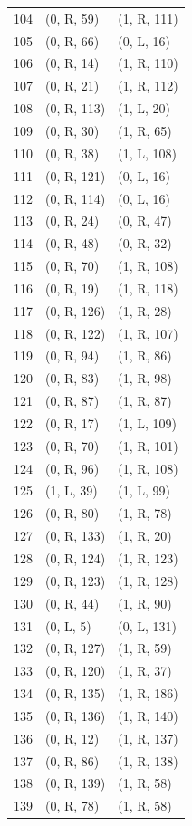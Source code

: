 \begin{longtable}{rll}
104 & (0, R, 59) & (1, R, 111) \\
105 & (0, R, 66) & (0, L, 16) \\
106 & (0, R, 14) & (1, R, 110) \\
107 & (0, R, 21) & (1, R, 112) \\
108 & (0, R, 113) & (1, L, 20) \\
109 & (0, R, 30) & (1, R, 65) \\
110 & (0, R, 38) & (1, L, 108) \\
111 & (0, R, 121) & (0, L, 16) \\
112 & (0, R, 114) & (0, L, 16) \\
113 & (0, R, 24) & (0, R, 47) \\
114 & (0, R, 48) & (0, R, 32) \\
115 & (0, R, 70) & (1, R, 108) \\
116 & (0, R, 19) & (1, R, 118) \\
117 & (0, R, 126) & (1, R, 28) \\
118 & (0, R, 122) & (1, R, 107) \\
119 & (0, R, 94) & (1, R, 86) \\
120 & (0, R, 83) & (1, R, 98) \\
121 & (0, R, 87) & (1, R, 87) \\
122 & (0, R, 17) & (1, L, 109) \\
123 & (0, R, 70) & (1, R, 101) \\
124 & (0, R, 96) & (1, R, 108) \\
125 & (1, L, 39) & (1, L, 99) \\
126 & (0, R, 80) & (1, R, 78) \\
127 & (0, R, 133) & (1, R, 20) \\
128 & (0, R, 124) & (1, R, 123) \\
129 & (0, R, 123) & (1, R, 128) \\
130 & (0, R, 44) & (1, R, 90) \\
131 & (0, L, 5) & (0, L, 131) \\
132 & (0, R, 127) & (1, R, 59) \\
133 & (0, R, 120) & (1, R, 37) \\
134 & (0, R, 135) & (1, R, 186) \\
135 & (0, R, 136) & (1, R, 140) \\
136 & (0, R, 12) & (1, R, 137) \\
137 & (0, R, 86) & (1, R, 138) \\
138 & (0, R, 139) & (1, R, 58) \\
139 & (0, R, 78) & (1, R, 58) \\

\end{longtable}
